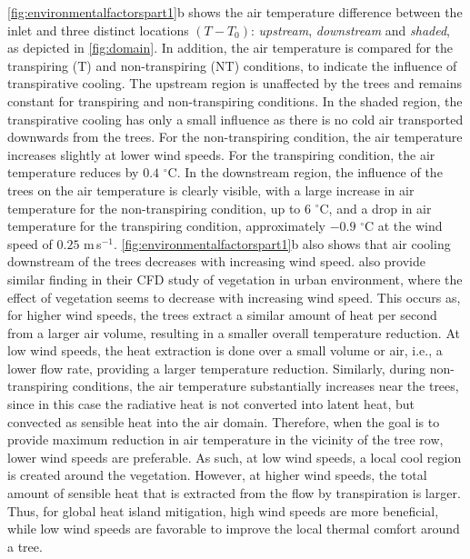 \cref{fig:environmentalfactorspart1}b shows the air temperature difference between the inlet and three distinct locations $(T-T_0)$: \textit{upstream}, \textit{downstream} and \textit{shaded}, as depicted in \cref{fig:domain}. In addition, the air temperature is compared for the transpiring (T) and non-transpiring (NT) conditions, to indicate the influence of transpirative cooling. The upstream region is unaffected by the trees and remains constant for transpiring and non-transpiring conditions. In the shaded region, the transpirative cooling has only a small influence as there is no cold air transported downwards from the trees. For the non-transpiring condition, the air temperature increases slightly at lower wind speeds. For the transpiring condition, the air temperature reduces by $0.4$ $^{\circ}$C. In the downstream region, the influence of the trees on the air temperature is clearly visible, with a large increase in air temperature for the non-transpiring condition, up to 6 $^{\circ}$C, and a drop in air temperature for the transpiring condition, approximately $-0.9$ $^{\circ}$C at the wind speed of $0.25$ m\,s$^{-1}$. \cref{fig:environmentalfactorspart1}b also shows that air cooling downstream of the trees decreases with increasing wind speed. \cite{Dimoudi2003} also provide similar finding in their CFD study of vegetation in urban environment, where the effect of vegetation seems to decrease with increasing wind speed. This occurs as, for higher wind speeds, the trees extract a similar amount of heat per second from a larger air volume, resulting in a smaller overall temperature reduction. At low wind speeds, the heat extraction is done over a small volume or air, i.e., a lower flow rate, providing a larger temperature reduction. Similarly, during non-transpiring conditions, the air temperature substantially increases near the trees, since in this case the radiative heat is not converted into latent heat, but convected as sensible heat into the air domain. Therefore, when the goal is to provide maximum reduction in air temperature in the vicinity of the tree row, lower wind speeds are preferable. As such, at low wind speeds, a local cool region is created around the vegetation. However, at higher wind speeds, the total amount of sensible heat that is extracted from the flow by transpiration is larger. Thus, for global heat island mitigation, high wind speeds are more beneficial, while low wind speeds are favorable to improve the local thermal comfort around a tree.

